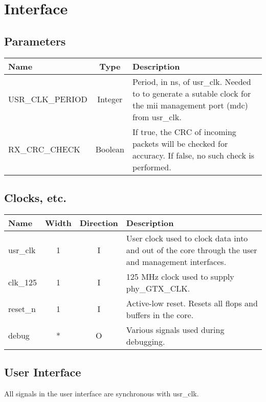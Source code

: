 \documentclass[11pt]{article}
\begin{document}
\section{Interface}

\subsection{Parameters}
\begin{tabular}{lcp{4.0in}}
\hline
Name & Type & Description \\
\hline

\hline USR\_CLK\_PERIOD & Integer & Period, in ns, of usr\_clk.
Needed to to generate a sutable clock for the mii management port
(mdc) from usr\_clk. \\

\hline RX\_CRC\_CHECK & Boolean & If true, the CRC of incoming packets
will be checked for accuracy.  If false, no such check is performed. \\

\hline
\end{tabular}

\subsection{Clocks, etc.}
\begin{tabular}{p{0.85in}ccp{4.0in}}
\hline
Name & Width & Direction & Description \\
\hline

\hline usr\_clk & 1 & I & User clock used to clock data into and out
of the core through the user and management interfaces. \\

\hline clk\_125 & 1 & I & 125 MHz clock used to supply phy\_GTX\_CLK. \\

\hline reset\_n & 1 & I & Active-low reset.  Resets all flops and
buffers in the core. \\

\hline debug & * & O & Various signals used during debugging. \\
\hline
\end{tabular}

\subsection{User Interface}

All signals in the user interface are synchronous with usr\_clk.
\end{document}
